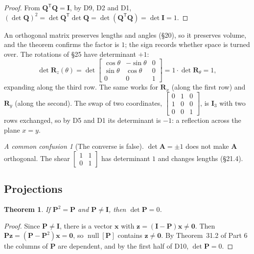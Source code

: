 \documentclass[11pt]{article}
\theoremstyle{plain}
\newtheorem{thm}{Theorem}[section]
\theoremstyle{definition}
\theoremstyle{remark}
\newtheorem*{warn}{A common confusion}
\newcommand{\vc}[1]{\mathbf{#1}}
\newcommand{\mt}[1]{\mathbf{#1}}
\newcommand{\T}{^{\mathsf{T}}}
\newcommand{\nullsp}[1]{\operatorname{null}[#1]}
\begin{document}
\begin{proof}
From $\mt{Q}\T\mt{Q}=\mt{I}$, by D9, D2 and D1,
$(\det\mt{Q})^{2}=\det\mt{Q}\T\det\mt{Q}=\det(\mt{Q}\T\mt{Q})=\det\mt{I}=1$.
\end{proof}

\noindent An orthogonal matrix preserves lengths and angles (\S20), so it
preserves volume, and the theorem confirms the factor is $1$; the sign records
whether space is turned over. The rotations of \S25 have determinant $+1$:
\[
  \det\mt{R}_z(\theta)=\det\begin{bmatrix}\cos\theta&-\sin\theta&0\\\sin\theta&\cos\theta&0\\0&0&1\end{bmatrix}
  =1\cdot\det\mt{R}_\theta=1,
\]
expanding along the third row. The same works for $\mt{R}_x$ (along the first
row) and $\mt{R}_y$ (along the second). The swap of two coordinates,
$\begin{bmatrix}0&1&0\\1&0&0\\0&0&1\end{bmatrix}$, is $\mt{I}_3$ with two rows
exchanged, so by D5 and D1 its determinant is $-1$: a reflection across the plane
$x=y$.

\begin{warn}[The converse is false]
$\det\mt{A}=\pm1$ does not make $\mt{A}$ orthogonal. The shear
$\begin{bmatrix}1&1\\0&1\end{bmatrix}$ has determinant $1$ and changes lengths
(\S21.4).
\end{warn}

\subsection{Projections}
\begin{thm}
If $\mt{P}^{2}=\mt{P}$ and $\mt{P}\neq\mt{I}$, then $\det\mt{P}=0$.
\end{thm}

\begin{proof}
Since $\mt{P}\neq\mt{I}$, there is a vector $\vc{x}$ with
$\vc{z}=(\mt{I}-\mt{P})\vc{x}\neq\vc{0}$. Then
$\mt{P}\vc{z}=(\mt{P}-\mt{P}^{2})\vc{x}=\vc{0}$, so $\nullsp{\mt{P}}$ contains
$\vc{z}\neq\vc{0}$. By Theorem~31.2 of Part 6 the columns of $\mt{P}$ are
dependent, and by the first half of D10, $\det\mt{P}=0$.
\end{proof}
\end{document}

